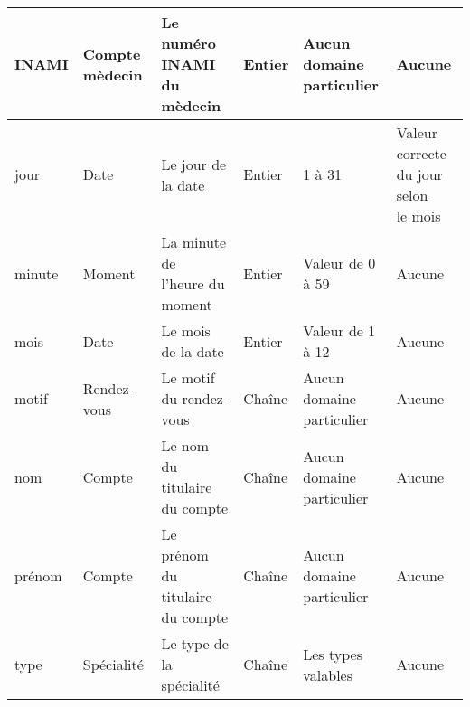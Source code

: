\documentclass[a4paper, 11pt]{report}
\begin{document}
\begin{center}
\begin{longtable}{|p{2cm}|p{2cm}|p{3cm}|p{2cm}|p{2cm}|p{2cm}|}
        \hline
        INAMI & Compte mèdecin & \parbox[t]{3cm}{Le numéro \\INAMI du mèdecin\\} & Entier & \parbox[t]{2cm}{Aucun\\ domaine particulier\\}
        & Aucune \\
        \hline
        jour & Date & Le jour de la date & Entier & 1 à 31 & \parbox[t]{2cm}{Valeur \\correcte du jour selon\\ le mois\\} \\
        \hline
        minute & Moment & \parbox[t]{3cm}{La minute de\\ l'heure du\\ moment\\} & Entier & Valeur de 0 à 59 &
        Aucune \\
        \hline
        mois & Date & Le mois de la date & Entier & Valeur de 1 à 12 & Aucune \\
        \hline
        motif & Rendez-vous & \parbox[t]{3cm}{Le motif \\du rendez-vous\\} & Chaîne & \parbox[t]{2cm}{Aucun\\ domaine particulier\\}
        & Aucune \\
        \hline
        nom & Compte & \parbox[t]{3cm}{Le nom du titulaire du compte\\} & Chaîne & \parbox[t]{2cm}{Aucun\\ domaine particulier\\}
        & Aucune \\
        \hline
        prénom & Compte & \parbox[t]{3cm}{Le prénom du titulaire du compte\\} & Chaîne & \parbox[t]{2cm}{Aucun\\ domaine particulier\\}
        & Aucune \\
        \hline
        type & Spécialité & \parbox[t]{3cm}{Le type de\\ la spécialité\\} & Chaîne & \parbox[t]{2cm}{Les types\\ valables\\} & Aucune\\
        \hline
        
\end{longtable}
\end{center}
\end{document}
